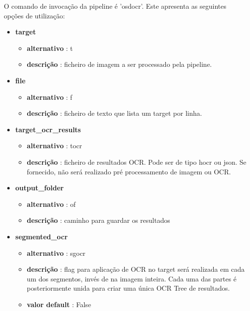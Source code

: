 O comando de invocação da pipeline é 'osdocr'. Este apresenta as seguintes opções de utilização:

\begin{itemize}\setlength\itemsep{-0.8em}
	\item \textbf{target} 
		\begin{itemize}\setlength\itemsep{-0.5em}
			\item \textbf{alternativo} : t
			\item \textbf{descrição} : ficheiro de imagem a ser processado pela pipeline.
		\end{itemize}
		
	\item \textbf{file}
		\begin{itemize}\setlength\itemsep{-0.5em}
			\item \textbf{alternativo} : f
			\item \textbf{descrição} : ficheiro de texto que lista um target por linha.
		\end{itemize}
		
	\item \textbf{target\_ocr\_results} 
		\begin{itemize}\setlength\itemsep{-0.5em}
			\item \textbf{alternativo} : tocr
			\item \textbf{descrição} : ficheiro de resultados OCR. Pode ser de tipo hocr ou json. Se fornecido, não será realizado pré processamento de imagem ou OCR.
		\end{itemize}
		
	\item \textbf{output\_folder}
		\begin{itemize}\setlength\itemsep{-0.5em}
			\item \textbf{alternativo} : of
			\item \textbf{descrição} : caminho para guardar os resultados
		\end{itemize}
		
	
	\item \textbf{segmented\_ocr}
		\begin{itemize}\setlength\itemsep{-0.5em}
			\item \textbf{alternativo} : sgocr
			\item \textbf{descrição} : flag para aplicação de OCR no target será realizada em cada um dos segmentos, invés de na imagem inteira. Cada uma das partes é posteriormente unida para criar uma única OCR Tree de resultados.
			\item \textbf{valor default} : False
		\end{itemize}
		

\end{itemize}
